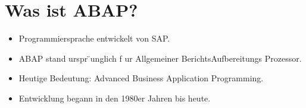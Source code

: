 \documentclass[../handout.tex]{subfiles}
\begin{document}
\section{Was ist ABAP?}

\begin{itemize}
    \item Programmiersprache entwickelt von SAP.
    \item ABAP stand urspr ̈unglich f ur Allgemeiner BerichtsAufbereitungs Prozessor.
    \item Heutige Bedeutung: Advanced Business Application Programming.
    \item Entwicklung begann in den 1980er Jahren bis heute.
\end{itemize}
\end{document}
